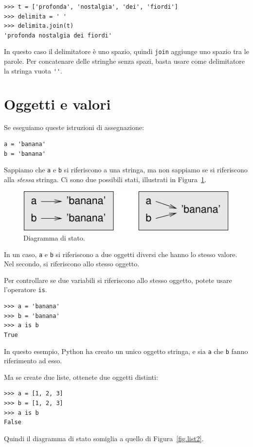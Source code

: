 \documentclass[10pt]{book}
\begin{document}
\begin{verbatim}
>>> t = ['profonda', 'nostalgia', 'dei', 'fiordi']
>>> delimita = ' '
>>> delimita.join(t)
'profonda nostalgia dei fiordi'
\end{verbatim}
%
In questo caso il delimitatore è uno spazio, quindi
{\tt join} aggiunge uno spazio tra le parole. Per concatenare delle stringhe senza spazi, basta usare come delimitatore la stringa vuota \verb"''".


\section{Oggetti e valori}

Se eseguiamo queste istruzioni di assegnazione:

\begin{verbatim}
a = 'banana'
b = 'banana'
\end{verbatim}
%
Sappiamo che {\tt a} e {\tt b} si riferiscono a una stringa, ma non sappiamo se si riferiscono alla {\em stessa} stringa.
Ci sono due possibili stati, illustrati in Figura~\ref{fig.list1}.

\begin{figure}
\centerline
{\includegraphics[scale=0.8]{figs/list1.pdf}}
\caption{Diagramma di stato.}
\label{fig.list1}
\end{figure}


In un caso, {\tt a} e {\tt b} si riferiscono a due oggetti diversi che hanno lo stesso valore. Nel secondo, si riferiscono allo stesso oggetto.

Per controllare se due variabili si riferiscono allo stesso oggetto, potete usare l'operatore {\tt is}.

\begin{verbatim}
>>> a = 'banana'
>>> b = 'banana'
>>> a is b
True
\end{verbatim}
%
In questo esempio, Python ha creato un unico oggetto stringa, e sia {\tt a} che {\tt b} fanno riferimento ad esso.

Ma se create due liste, ottenete due oggetti distinti:

\begin{verbatim}
>>> a = [1, 2, 3]
>>> b = [1, 2, 3]
>>> a is b
False
\end{verbatim}
%
Quindi il diagramma di stato somiglia a quello di Figura~\ref{fig.list2}.
\end{document}

